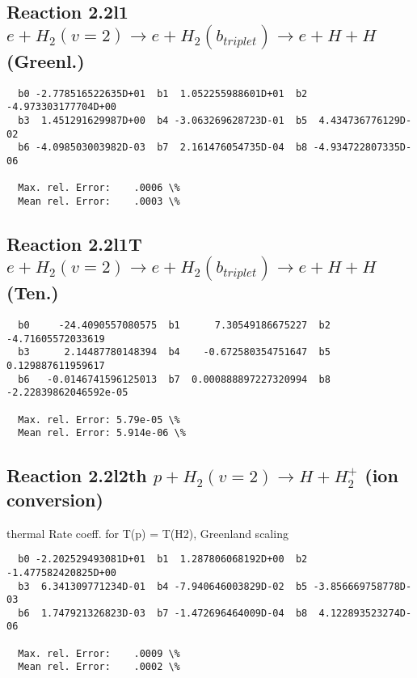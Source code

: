 \documentclass[12pt,dvipdfmx]{article}
\begin{document}
\newpage
\subsection{
Reaction 2.2l1
$ e + H_2(v=2) \rightarrow e + H_2(b_{triplet})\rightarrow e + H + H $ (Greenl.)
}


\begin{small}\begin{verbatim}
  b0 -2.778516522635D+01  b1  1.052255988601D+01  b2 -4.973303177704D+00
  b3  1.451291629987D+00  b4 -3.063269628723D-01  b5  4.434736776129D-02
  b6 -4.098503003982D-03  b7  2.161476054735D-04  b8 -4.934722807335D-06

  Max. rel. Error:    .0006 \%
  Mean rel. Error:    .0003 \%
\end{verbatim}\end{small}


\subsection{
Reaction 2.2l1T
$ e +  H_2(v=2) \rightarrow e + H_2(b_{triplet})\rightarrow e + H + H $ (Ten.)
}


\begin{small}\begin{verbatim}
  b0     -24.4090557080575  b1      7.30549186675227  b2     -4.71605572033619
  b3      2.14487780148394  b4    -0.672580354751647  b5     0.129887611959617
  b6   -0.0146741596125013  b7  0.000888897227320994  b8 -2.22839862046592e-05

  Max. rel. Error: 5.79e-05 \%
  Mean rel. Error: 5.914e-06 \%
\end{verbatim}\end{small}


\subsection{
Reaction 2.2l2th
$ p + H_2(v=2) \rightarrow H + H_2^+$ (ion conversion)
}
thermal Rate coeff. for T(p) = T(H2), Greenland scaling

\begin{small}\begin{verbatim}
  b0 -2.202529493081D+01  b1  1.287806068192D+00  b2 -1.477582420825D+00
  b3  6.341309771234D-01  b4 -7.940646003829D-02  b5 -3.856669758778D-03
  b6  1.747921326823D-03  b7 -1.472696464009D-04  b8  4.122893523274D-06

  Max. rel. Error:    .0009 \%
  Mean rel. Error:    .0002 \%
\end{verbatim}\end{small}
\end{document}
